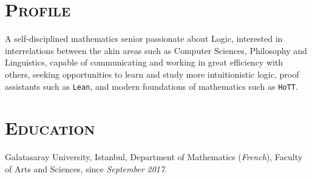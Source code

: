 \documentclass[oneside]{memoir}
\begin{document}
\raggedright
\section*{\textsc{Profile}}
A self-disciplined mathematics senior passionate about Logic, interested
in interrelations between the akin areas such as Computer Sciences,
Philosophy and Linguistics, capable of communicating and working in great
efficiency with others, seeking opportunities to learn and study more
intuitionistic logic, proof assistants such as \texttt{Lean}, and modern
foundations of mathematics such as \texttt{HoTT}.
\section*{\textsc{Education}}
Galatasaray University, Istanbul, Department of Mathematics
(\textit{French}), Faculty of
Arts and Sciences, since \textit{September 2017}.
%
\end{document}
